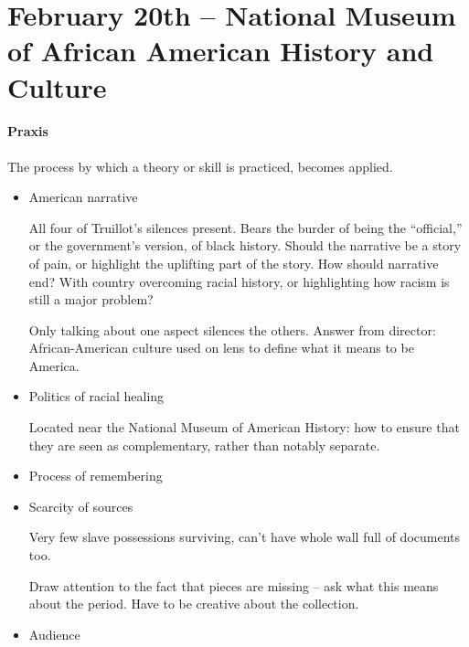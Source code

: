 \section{February 20th -- National Museum of African American History and Culture} 

\paragraph{Praxis} The process by which a theory or skill is practiced, becomes applied.

\begin{itemize}
  \item American narrative

  All four of Truillot's silences present. Bears the burder of being the ``official,'' or the government's version, of black history. Should the narrative be a story of pain, or highlight the uplifting part of the story. How should narrative end? With country overcoming racial history, or highlighting how racism is still a major problem?

  Only talking about one aspect silences the others. Answer from director: African-American culture used on lens to define what it means to be America.

  \item Politics of racial healing

  Located near the National Museum of American History: how to ensure that they are seen as complementary, rather than notably separate.

  \item Process of remembering
  \item Scarcity of sources

  Very few slave possessions surviving, can't have whole wall full of documents too. 

  Draw attention to the fact that pieces are missing -- ask what this means about the period. Have to be creative about the collection.

  \item Audience
\end{itemize}